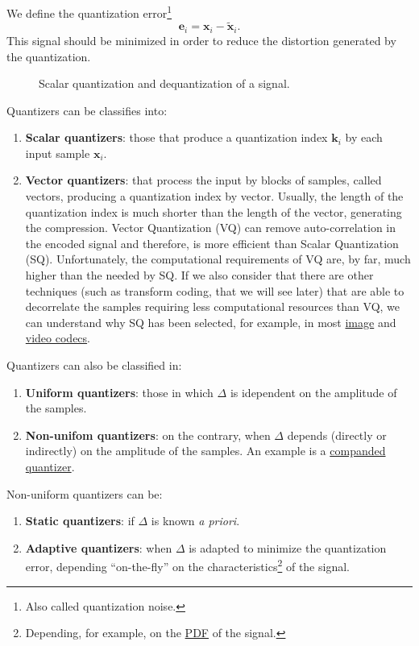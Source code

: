We define the quantization error\footnote{Also called quantization
noise.}
\begin{equation}
  {\mathbf e}_i = {\mathbf x}_i - \tilde{{\mathbf x}}_i.
\end{equation}
This signal should be minimized in order to reduce the distortion
generated by the quantization.

\begin{figure}
  \centering
  \caption{Scalar quantization and dequantization of a signal.}
  \label{fig:Q}
\end{figure}

Quantizers can be classifies into:
\begin{enumerate}
\item \textbf{Scalar quantizers}: those that produce a quantization
  index ${\mathbf k}_i$ by each input sample ${\mathbf x}_i$.
\item \textbf{Vector quantizers}: that process the input by blocks of
  samples, called vectors, producing a quantization index by vector.
  Usually, the length of the quantization index is much shorter than
  the length of the vector, generating the compression. Vector
  Quantization (VQ) can remove auto-correlation in the encoded signal
  and therefore, is more efficient than Scalar Quantization
  (SQ). Unfortunately, the computational requirements of VQ are, by
  far, much higher than the needed by SQ. If we also consider that
  there are other techniques (such as transform coding, that we will
  see later) that are able to decorrelate the samples requiring less
  computational resources than VQ, we can understand why SQ has been
  selected, for example, in
  most \href{https://en.wikipedia.org/wiki/Image_compression}{image}
  and \href{https://en.wikipedia.org/wiki/Video_coding_format}{video
  codecs}.
\end{enumerate}

Quantizers can also be classified in:
\begin{enumerate}
\item \textbf{Uniform quantizers}: those in which $\Delta$ is
  idependent on the amplitude of the samples.
\item \textbf{Non-unifom quantizers}: on the contrary, when $\Delta$
  depends (directly or indirectly) on the amplitude of the samples. An
  example is a
  \href{https://en.wikipedia.org/wiki/Companding}{companded
    quantizer}.
\end{enumerate}

Non-uniform quantizers can be:
\begin{enumerate}
\item \textbf{Static quantizers}: if $\Delta$ is known \emph{a
priori}.
\item \textbf{Adaptive quantizers}: when $\Delta$ is adapted to
  minimize the quantization error, depending ``on-the-fly'' on the
  characteristics\footnote{Depending, for example, on the
    \href{https://en.wikipedia.org/wiki/Probability_density_function}{PDF}
    of the signal.} of the signal.
\end{enumerate}

